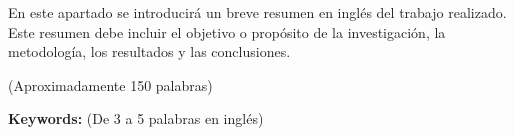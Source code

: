 
En este apartado se introducirá un breve resumen en inglés del trabajo realizado. Este resumen debe incluir el objetivo o propósito de la investigación, la metodología, los resultados y las conclusiones.

(Aproximadamente 150 palabras)

\textbf{Keywords:} (De 3 a 5 palabras en inglés)